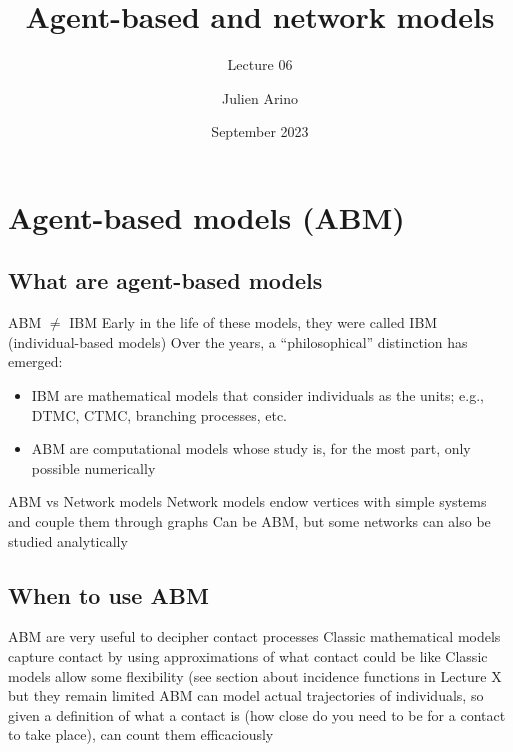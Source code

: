 \documentclass[aspectratio=43]{beamer}
\title{Agent-based and network models}
\subtitle{Lecture 06}
\author{Julien Arino}
\date{September 2023}
\begin{document}
\begin{frame}
  \titlepage
\end{frame}
\addtocounter{page}{-1}

\begin{frame}
    \tableofcontents[hideallsubsections]
\end{frame}
\addtocounter{page}{-1}

\section{Agent-based models (ABM)}

\subsection{What are agent-based models}

\begin{frame}{ABM $\neq$ IBM}
Early in the life of these models, they were called IBM (individual-based models)
\vfill
Over the years, a ``philosophical'' distinction has emerged:
\begin{itemize}
\item IBM are mathematical models that consider individuals as the units; e.g., DTMC, CTMC, branching processes, etc.
\item ABM are computational models whose study is, for the most part, only possible numerically 
\end{itemize}
\end{frame} 

\begin{frame}{ABM vs Network models}
Network models endow vertices with simple systems and couple them through graphs
\vfill
Can be ABM, but some networks can also be studied analytically
\end{frame} 


\subsection{When to use ABM}

\begin{frame}{ABM are very useful to decipher contact processes}
Classic mathematical models capture contact by using approximations of what contact could be like
\vfill
Classic models allow some flexibility (see section about incidence functions in Lecture X but they remain limited
\vfill
ABM can model actual trajectories of individuals, so given a definition of what a contact is (how close do you need to be for a contact to take place), can count them efficaciously
\end{frame} 
\end{document}
